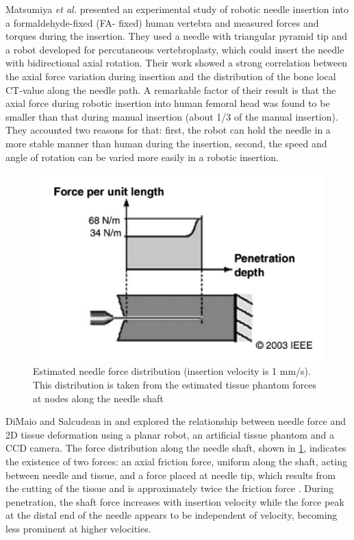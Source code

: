 Matsumiya \textit{et al.} \cite{10.1007/978-3-540-39899-8_34} presented an experimental study of robotic needle insertion into a formaldehyde-fixed (FA- fixed) human vertebra and measured forces and torques during the insertion.
They used a needle with triangular pyramid tip and a robot developed for percutaneous vertebroplasty, which could insert the needle with bidirectional axial rotation.
Their work showed a strong correlation between the axial
force variation during insertion and the distribution of the bone local CT-value along the needle path.
A remarkable factor of their result is that the axial force during robotic insertion into human femoral head was found to be smaller than that during manual insertion (about 1/3 of the manual insertion).
They accounted two reasons for that: first, the robot can hold the needle in a more stable manner than human during the insertion, second, the  speed and angle of rotation can be varied more easily in a robotic insertion.
\begin{figure}
	\centering
	\includegraphics[width=(\textwidth/2)]{images/DiMaio_force_distribution.png}
	\caption[Force distribution in puncturing]{Estimated needle force distribution (insertion velocity is 1 mm/s). This distribution is taken from the estimated tissue phantom forces at nodes along the needle shaft  \cite{DiMaio2003}}
	\label{fig:DiMaio_force_distribution}
\end{figure}

DiMaio and Salcudean in \cite{DiMaio2003} and \cite{DiMaio2005} explored the relationship between needle force and 2D tissue deformation using a planar robot, an artificial tissue phantom and a CCD camera. The force distribution along the needle shaft, shown in \figurename{ \ref{fig:DiMaio_force_distribution}}, indicates the existence of two forces: an axial friction force, uniform along the shaft, acting between needle and tissue, and a force placed at needle tip, which results from the cutting of the tissue and is approximately twice the friction force \cite{DiMaio2003}.
During penetration, the shaft force increases with insertion velocity while the force peak at the distal end of the needle appears to be independent of velocity, becoming less prominent at higher velocities.

